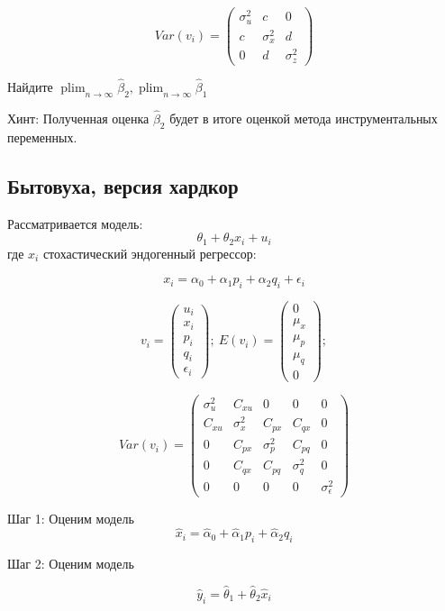 \documentclass[10pt, a4paper]{extarticle}
\DeclareMathOperator{\plim}{plim}
\begin{document}
\[
Var(v_{i}) = \begin{pmatrix}  \sigma_{u}^2 & c & 0 \\
c & \sigma_{x}^2  & d \\
0 & d  & \sigma_z^2 \end{pmatrix}
\]

Найдите $\plim_{n \to \infty} \hat \beta_{2}, \plim_{n \to \infty} \hat \beta_{1}$

Хинт: Полученная оценка $\hat \beta_{2}$ будет в итоге оценкой метода инструментальных переменных.


\subsection{Бытовуха, версия хардкор}

Рассматривается модель: 
\[
\theta_1 + \theta_2 x_i + u_i
\]
где $x_i$ стохастический эндогенный
регрессор:

\[
x_i = \alpha_0 + \alpha_1 p_i + \alpha_2 q_i + \epsilon_i
\]


\[
v_{i} = \begin{pmatrix}  u_{i} \\ x_{i} \\  p_{i} \\ q_{i}  \\ \epsilon_{i} \end{pmatrix}; \ E(v_{i}) = \begin{pmatrix}  0 \\ \mu_{x} \\ \mu_{p} \\ \mu_{q} \\ 0\end{pmatrix};
\]

\[
Var(v_{i}) = \begin{pmatrix}  \sigma_{u}^2 & C_{xu} & 0 & 0 & 0\\
C_{xu} & \sigma_{x}^2  & C_{px} & C_{qx} & 0\\
0 & C_{px} & \sigma_p^2 & C_{pq}  & 0\\
0 & C_{qx} & C_{pq} & \sigma_q^2 & 0 \\
0 & 0 & 0 & 0 & \sigma_\epsilon^2\end{pmatrix}
\]

Шаг 1: Оценим модель
\[
\hat{x}_i = \hat{\alpha}_0 + \hat{\alpha}_1 p_i + \hat{\alpha}_2 q_i
\]

Шаг 2: Оценим модель

\[
\hat{y}_i = \hat{\theta}_1 + \hat{\theta}_2 \hat{x}_i
\]
\end{document}
